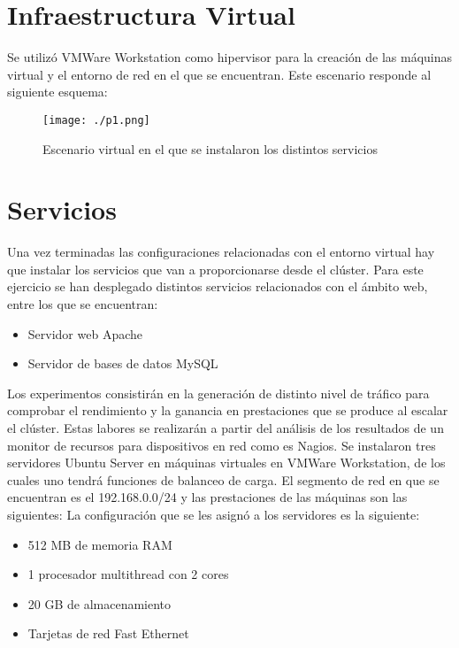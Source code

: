 \documentclass[paper=a4, fontsize=12pt]{scrartcl} %
\begin{document}
\section{Infraestructura Virtual}

Se utilizó VMWare Workstation como hipervisor para la creación de las máquinas virtual y el entorno de red en el que se encuentran. Este escenario responde al siguiente esquema:

\begin{figure}[H] %
	\centering
	\label{lsblk}
	\texttt{[image: ./p1.png]}
	\caption{Escenario virtual en el que se instalaron los distintos servicios} 
\end{figure}


\section{Servicios}

Una vez terminadas las configuraciones relacionadas con el entorno virtual hay que instalar los servicios que van a proporcionarse desde el clúster. Para este ejercicio se han desplegado distintos servicios relacionados con el ámbito web, entre los que se encuentran:
\begin{itemize}
	\item Servidor web Apache
	\item Servidor de bases de datos MySQL
\end{itemize}

Los experimentos consistirán en la generación de distinto nivel de tráfico para comprobar el rendimiento y la ganancia en prestaciones que se produce al escalar el clúster. Estas labores se realizarán a partir del análisis de los resultados de un monitor de recursos para dispositivos en red como es Nagios.
Se instalaron tres servidores Ubuntu Server en máquinas virtuales en VMWare Workstation, de los cuales uno tendrá funciones de balanceo de carga. El segmento de red en que se encuentran es el 192.168.0.0/24 y las prestaciones de las máquinas son las siguientes:
La configuración que se les asignó a los servidores es la siguiente:
\begin{itemize}
	\item 512 MB de memoria RAM
	\item 1 procesador multithread con 2 cores
	\item 20 GB de almacenamiento
	\item Tarjetas de red Fast Ethernet
\end{itemize}
\end{document}
